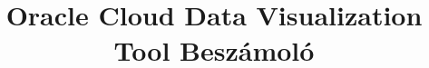 \documentclass{article}
\title{Oracle Cloud Data Visualization Tool Beszámoló}
\begin{document}
\maketitle
\tableofcontents
\pagebreak







\listoffigures
\end{document}
